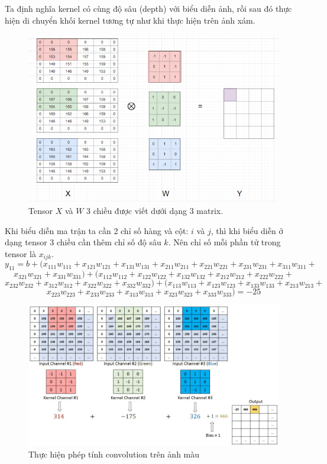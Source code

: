 Ta định nghĩa kernel có cùng độ sâu (depth) với biểu diễn ảnh, rồi sau đó thực hiện di chuyển khối kernel tương tự như khi thực hiện trên ảnh xám.
\newpage
\FloatBarrier
\begin{figure}[htp]
\begin{center}
\includegraphics[scale=1]{chap2/c2_figs/14.png}
\end{center}
\caption{Tensor $X$ và $W$ 3 chiều được viết dưới dạng 3 matrix.}
\label{fig:padding,stride}
\end{figure}
\FloatBarrier

Khi biểu diễn ma trận ta cần 2 chỉ số hàng và cột: $i$ và $j$, thì khi biểu diễn ở dạng tensor 3 chiều cần thêm chỉ số độ sâu $k$. Nên chỉ số mỗi phần tử trong tensor là $x_{ijk}$.
$$y_{11} = b + (x_{111}w_{111} +  x_{121}w_{121} + x_{131}w_{131} +  x_{211}w_{211} +  x_{221}w_{221} +  x_{231}w_{231} +  x_{311}w_{311} + $$ $$ x_{321}w_{321} +  x_{331}w_{331}) + (x_{112}w_{112} +  x_{122}w_{122} + x_{132}w_{132} +  x_{212}w_{212} +  x_{222}w_{222} + $$ $$x_{232}w_{232} +  x_{312}w_{312} +  x_{322}w_{322} +  x_{332}w_{332}) +  (x_{113}w_{113} +  x_{123}w_{123} + x_{133}w_{133} +  x_{213}w_{213} + $$ $$ x_{223}w_{223} +  x_{233}w_{233} +  x_{313}w_{313} +  x_{323}w_{323} +  x_{333}w_{333}) = -25$$

\FloatBarrier
\begin{figure}[htp]
\begin{center}
\includegraphics[scale=0.456]{chap2/c2_figs/8.jpg}
\end{center}
\caption{Thực hiện phép tính convolution trên ảnh màu}
\label{fig:padding,stride}
\end{figure}
\FloatBarrier

